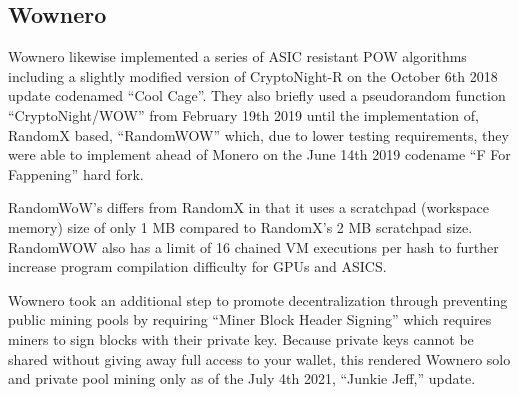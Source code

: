 \subsection{Wownero}
Wownero likewise implemented a series of ASIC resistant POW algorithms including a slightly modified version of CryptoNight-R on the October 6th 2018 update codenamed ``Cool Cage''\cite{wowrepo}. They also briefly used a pseudorandom function ``CryptoNight/WOW'' from February 19th 2019 until the implementation of, RandomX based, ``RandomWOW'' which, due to lower testing requirements, they were able to implement ahead of Monero on the June 14th 2019 codename ``F For Fappening'' hard fork\cite{wowrepo}.

RandomWoW's differs from RandomX in that it uses a scratchpad (workspace memory)\cite{randomx_medium} size of only 1 MB compared to RandomX's 2 MB scratchpad size\cite{wowrepo}. RandomWOW also has a limit of 16 chained VM executions per hash to further increase program compilation difficulty for GPUs and ASICS\cite{wowrepo}.

Wownero took an additional step to promote decentralization through preventing public mining pools by requiring ``Miner Block Header Signing'' which requires miners to sign blocks with their private key\cite{wowrepo,jwinterview}. Because private keys cannot be shared without giving away full access to your wallet, this rendered Wownero solo and private pool mining only as of the July 4th 2021, ``Junkie Jeff,'' update\cite{wowrepo}.

